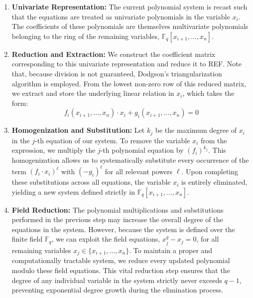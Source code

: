 \begin{enumerate}
    \item \textbf{Univariate Representation:} The current polynomial system is recast such that the equations are treated as univariate polynomials in the variable $x_i$. The coefficients of these polynomials are themselves multivariate polynomials belonging to the ring of the remaining variables, $\mathbb{F}_q[x_{i+1}, \dots, x_n]$.
    
    \item \textbf{Reduction and Extraction:} We construct the coefficient matrix corresponding to this univariate representation and reduce it to REF. Note that, because division is not guaranteed, Dodgson's triangularization~\cite{} algorithm is employed. From the lowest non-zero row of this reduced matrix, we extract and store the underlying linear relation in $x_i$, which takes the form: 
    \begin{equation}
        f_i(x_{i+1}, \dots, x_n)\cdot x_i + g_i(x_{i+1}, \dots, x_n) = 0
        \label{eq:step_i_relation}
    \end{equation}
    
    \item \textbf{Homogenization and Substitution:} Let $k_j$ be the maximum degree of $x_i$ in the $j$-th equation of our system. To remove the variable $x_i$ from the expression, we multiply the $j$-th polynomial equation by $(f_i)^{k_j}$. This homogenization allows us to systematically substitute every occurrence of the term $(f_i\cdot x_i)^\ell$ with $(-g_i)^\ell$ for all relevant powers $\ell$. Upon completing these substitutions across all equations, the variable $x_i$ is entirely eliminated, yielding a new system defined strictly in $\mathbb{F}_q[x_{i+1}, \dots, x_n]$.
    
    \item \textbf{Field Reduction:} The polynomial multiplications and substitutions performed in the previous step may increase the overall degree of the equations in the system. However, because the system is defined over the finite field $\mathbb{F}_q$, we can exploit the field equations, $x_j^q - x_j = 0$, for all remaining variables $x_j \in \{x_{i+1}, \dots, x_n\}$. To maintain a proper and computationally tractable system, we reduce every updated polynomial modulo these field equations. This vital reduction step ensures that the degree of any individual variable in the system strictly never exceeds $q-1$, preventing exponential degree growth during the elimination process.
\end{enumerate}

